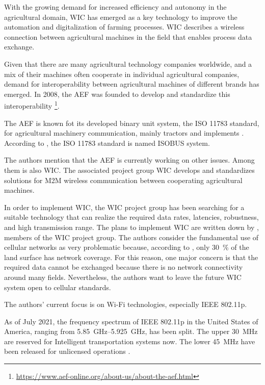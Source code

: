 With the growing demand for increased efficiency and autonomy in the agricultural domain, \ac{WIC} has emerged as a key technology to improve the automation
and digitalization of farming processes. \ac{WIC} describes a wireless connection between agricultural machines
in the field that enables process data exchange.

Given that there are many agricultural technology companies worldwide, and a mix of their machines often cooperate in individual agricultural companies, demand for interoperability between agricultural machines of different brands
has emerged.
In 2008, the \ac{AEF} was founded to develop and standardize this interoperability
\footnote{\url{https://www.aef-online.org/about-us/about-the-aef.html}}.

The AEF is known fot its developed binary unit system, the ISO 11783 standard, for agricultural machinery communication, mainly tractors and
implements \cite{iglesias_enabling_2014}.
According to \textcite{schlingmann_aef_2019}, the ISO 11783 standard is named ISOBUS system.

The authors mention that the AEF is currently working on other issues.
Among them is also \ac{WIC}.
The associated project group \ac{WIC} develops and standardizes solutions for \ac{M2M} wireless
communication between cooperating agricultural machines.

In order to implement \ac{WIC}, the \ac{WIC} project group has been searching for a suitable technology
that can realize the required data rates, latencies, robustness, and high transmission range.
The plans to implement \ac{WIC} are written down by \textcite{schlingmann_challenges_2017}, members of the \ac{WIC} project group.
The authors consider the fundamental use of cellular networks as very problematic
because, according to \cite{itu2016facts}, only \SI{30}{\percent} of the land surface has network coverage.
For this reason, one major concern is that the required data cannot be exchanged because there is
no network connectivity around many fields.
Nevertheless, the authors want to leave the future \ac{WIC} system open
to cellular standards.

The authors' current focus is on Wi-Fi technologies, especially IEEE 802.11p.

As of July 2021, the frequency spectrum of IEEE 802.11p in the United States of
America, ranging from \SIrange{5.85}{5.925}{\giga\hertz}, has been split.
The upper \SI{30}{\mega\hertz}
are reserved for Intelligent transportation systems now.
The lower \SI{45}{\mega\hertz} have
been released for unlicensed operations \cite{fcc_use_2021}. 

